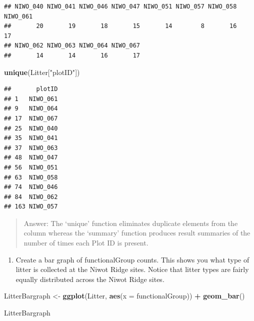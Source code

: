 \documentclass[]{article}
\newenvironment{Shaded}{\begin{snugshade}}{\end{snugshade}}
\newcommand{\KeywordTok}[1]{\textcolor[rgb]{0.13,0.29,0.53}{\textbf{#1}}}
\newcommand{\DataTypeTok}[1]{\textcolor[rgb]{0.13,0.29,0.53}{#1}}
\newcommand{\StringTok}[1]{\textcolor[rgb]{0.31,0.60,0.02}{#1}}
\newcommand{\OperatorTok}[1]{\textcolor[rgb]{0.81,0.36,0.00}{\textbf{#1}}}
\newcommand{\NormalTok}[1]{#1}
\providecommand{\tightlist}{%
  \setlength{\itemsep}{0pt}\setlength{\parskip}{0pt}}
\begin{document}
\begin{verbatim}
## NIWO_040 NIWO_041 NIWO_046 NIWO_047 NIWO_051 NIWO_057 NIWO_058 NIWO_061 
##       20       19       18       15       14        8       16       17 
## NIWO_062 NIWO_063 NIWO_064 NIWO_067 
##       14       14       16       17
\end{verbatim}

\begin{Shaded}
\begin{Highlighting}[]
\KeywordTok{unique}\NormalTok{(Litter[}\StringTok{"plotID"}\NormalTok{])}
\end{Highlighting}
\end{Shaded}

\begin{verbatim}
##       plotID
## 1   NIWO_061
## 9   NIWO_064
## 17  NIWO_067
## 25  NIWO_040
## 35  NIWO_041
## 37  NIWO_063
## 48  NIWO_047
## 56  NIWO_051
## 63  NIWO_058
## 74  NIWO_046
## 84  NIWO_062
## 163 NIWO_057
\end{verbatim}

\begin{quote}
Answer: The `unique' function eliminates duplicate elements from the
column whereas the `summary' function produces result summaries of the
number of times each Plot ID is present.
\end{quote}

\begin{enumerate}
\def\labelenumi{\arabic{enumi}.}
\setcounter{enumi}{13}
\tightlist
\item
  Create a bar graph of functionalGroup counts. This shows you what type
  of litter is collected at the Niwot Ridge sites. Notice that litter
  types are fairly equally distributed across the Niwot Ridge sites.
\end{enumerate}

\begin{Shaded}
\begin{Highlighting}[]
\NormalTok{LitterBargraph <-}\StringTok{ }\KeywordTok{ggplot}\NormalTok{(Litter, }\KeywordTok{aes}\NormalTok{(}\DataTypeTok{x =}\NormalTok{ functionalGroup)) }\OperatorTok{+}
\StringTok{  }\KeywordTok{geom_bar}\NormalTok{()}

\NormalTok{LitterBargraph}
\end{Highlighting}
\end{Shaded}
\end{document}
